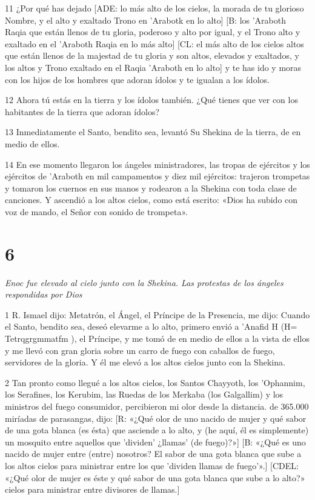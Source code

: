 \par 11 ¿Por qué has dejado [ADE: lo más alto de los cielos, la morada de tu glorioso Nombre, y el alto y exaltado Trono en 'Arabotk en lo alto] [B: los 'Araboth Raqia que están llenos de tu gloria, poderoso y alto por igual, y el Trono alto y exaltado en el 'Araboth Raqia en lo más alto] [CL: el más alto de los cielos altos que están llenos de la majestad de tu gloria y son altos, elevados y exaltados, y los altos y Trono exaltado en el Raqia 'Araboth en lo alto] y te has ido y moras con los hijos de los hombres que adoran ídolos y te igualan a los ídolos.

\par 12 Ahora tú estás en la tierra y los ídolos también. ¿Qué tienes que ver con los habitantes de la tierra que adoran ídolos?

\par 13 Inmediatamente el Santo, bendito sea, levantó Su Shekina de la tierra, de en medio de ellos.

\par 14 En ese momento llegaron los ángeles ministradores, las tropas de ejércitos y los ejércitos de 'Araboth en mil campamentos y diez mil ejércitos: trajeron trompetas y tomaron los cuernos en sus manos y rodearon a la Shekina con toda clase de canciones. Y ascendió a los altos cielos, como está escrito: «Dios ha subido con voz de mando, el Señor con sonido de trompeta».

\chapter{6}

\par \textit{Enoc fue elevado al cielo junto con la Shekina. Las protestas de los ángeles respondidas por Dios}

\par 1 R. Ismael dijo: Metatrón, el Ángel, el Príncipe de la Presencia, me dijo: Cuando el Santo, bendito sea, deseó elevarme a lo alto, primero envió a 'Anafid H (H= Tetrqgrgmmatfm ), el Príncipe, y me tomó de en medio de ellos a la vista de ellos y me llevó con gran gloria sobre un carro de fuego con caballos de fuego, servidores de la gloria. Y él me elevó a los altos cielos junto con la Shekina.

\par 2 Tan pronto como llegué a los altos cielos, los Santos Chayyoth, los 'Ophannim, los Serafines, los Kerubim, las Ruedas de los Merkaba (los Galgallim) y los ministros del fuego consumidor, percibieron mi olor desde la distancia. de 365.000 miríadas de parasangas, dijo: [R: «¿Qué olor de uno nacido de mujer y qué sabor de una gota blanca (es ésta) que asciende a lo alto, y (he aquí, él es simplemente) un mosquito entre aquellos que 'dividen' ¿llamas' (de fuego)?»] [B: «¿Qué es uno nacido de mujer entre (entre) nosotros? El sabor de una gota blanca que sube a los altos cielos para ministrar entre los que 'dividen llamas de fuego'».] [CDEL: «¿Qué olor de mujer es éste y qué sabor de una gota blanca que sube a lo alto?» cielos para ministrar entre divisores de llamas.]

